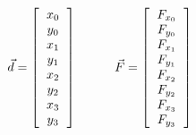 \documentclass{instrukcja}
\begin{document}
\begin{displaymath}
\vec d = \left[ \begin{tabular}{c} $x_0$ \\ $y_0$ \\ $x_1$ \\ $y_1$ \\ $x_2$ \\ $y_2$ \\ $x_3$ \\ $y_3$ \\ \end{tabular} \right] \quad \quad \quad \vec F = \left[ \begin{tabular}{c} $F_{x_0}$ \\ $F_{y_0}$ \\ $F_{x_1}$ \\ $F_{y_1}$ \\ $F_{x_2}$ \\ $F_{y_2}$ \\ $F_{x_3}$ \\ $F_{y_3}$ \\ \end{tabular} \right]
\end{displaymath}
\end{document}
